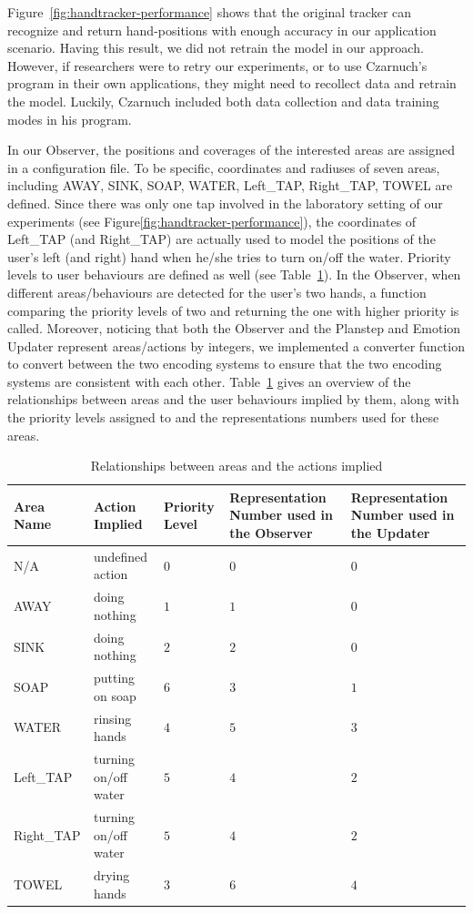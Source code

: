Figure~\ref{fig:handtracker-performance} shows that the original tracker can recognize and return hand-positions with enough accuracy in our application scenario. Having this result, we did not retrain the model in our approach. However, if researchers were to retry our experiments, or to use Czarnuch's program in their own applications, they might need to recollect data and retrain the model. Luckily, Czarnuch included both data collection and data training modes in his program.

In our Observer, the positions and coverages of the interested areas are assigned in a configuration file. To be specific, coordinates and radiuses of seven areas, including AWAY, SINK, SOAP, WATER, Left\_TAP, Right\_TAP, TOWEL are defined. Since there was only one tap involved in the laboratory setting of our experiments (see Figure\ref{fig:handtracker-performance}), the coordinates of Left\_TAP (and Right\_TAP) are actually used to model the positions of the user's left (and right) hand when he/she tries to turn on/off the water. Priority levels to user behaviours are defined as well (see Table~\ref{table:area-action}). In the Observer, when different areas/behaviours are detected for the user's two hands, a function comparing the priority levels of two and returning the one with higher priority is called. Moreover, noticing that both the Observer and the Planstep and Emotion Updater represent areas/actions by integers, we implemented a converter function to convert between the two encoding systems to ensure that the two encoding systems are consistent with each other. Table~\ref{table:area-action} gives an overview of the relationships between areas and the user behaviours implied by them, along with the priority levels assigned to and the representations numbers used for these areas.

%
\begin{table}
\centering
\caption{Relationships between areas and the actions implied}
\label{table:area-action}
\begin{tabular}{| l | l | p{2cm} | p{3cm} | p{3cm} |}
\hline
Area Name & Action Implied & Priority Level & 
Representation Number used in the Observer  & Representation Number used in the Updater \\ \hline
N/A & undefined action & $0$ & $0$ & $0$ \\ \hline
AWAY & doing nothing & $1$ & $1$ & $0$ \\ \hline
SINK & doing nothing & $2$ & $2$ & $0$ \\ \hline
SOAP & putting on soap & $6$ & $3$ & $1$ \\ \hline
WATER & rinsing hands & $4$ & $5$ & $3$ \\ \hline
Left\_TAP & turning on/off water & $5$ & $4$ & $2$ \\ \hline
Right\_TAP & turning on/off water & $5$ & $4$ & $2$ \\ \hline
TOWEL & drying hands & $3$ & $6$ & $4$ \\ \hline
\end{tabular}
\end{table}

